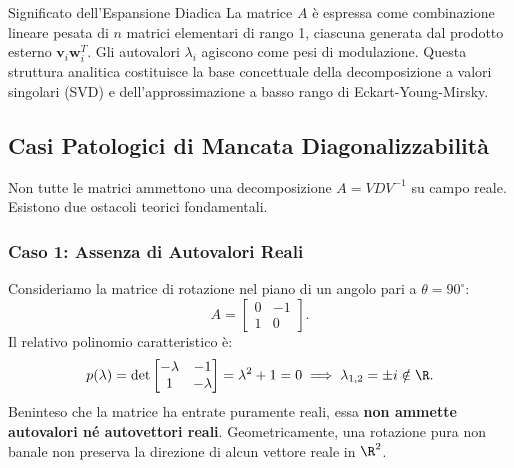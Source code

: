 \begin{noteblock}{Significato dell'Espansione Diadica}
La matrice $A$ \`e espressa come combinazione lineare pesata di $n$ matrici elementari di rango 1, ciascuna generata dal prodotto esterno $\mathbf{v}_i \mathbf{w}_i^T$. Gli autovalori $\lambda_i$ agiscono come pesi di modulazione. Questa struttura analitica costituisce la base concettuale della decomposizione a valori singolari (SVD) e dell'approssimazione a basso rango di Eckart-Young-Mirsky.
\end{noteblock}

\subsection{Casi Patologici di Mancata Diagonalizzabilit\`a}

Non tutte le matrici ammettono una decomposizione $A = V D V^{-1}$ su campo reale. Esistono due ostacoli teorici fondamentali.

\subsubsection{Caso 1: Assenza di Autovalori Reali}
Consideriamo la matrice di rotazione nel piano di un angolo pari a $\theta = 90^\circ$:
\begin{equation}
    A = \begin{bmatrix} 0 & -1 \\ 1 & 0 \end{bmatrix}.
\end{equation}
Il relativo polinomio caratteristico \`e:
\begin{equation}
    p(\lambda) = \det \begin{bmatrix} -\lambda & -1 \\ 1 & -\lambda \end{bmatrix} = \lambda^2 + 1 = 0 \implies \lambda_{1,2} = \pm i \notin \R.
\end{equation}
Beninteso che la matrice ha entrate puramente reali, essa \textbf{non ammette autovalori n\'e autovettori reali}. Geometricamente, una rotazione pura non banale non preserva la direzione di alcun vettore reale in $\R^2$.

